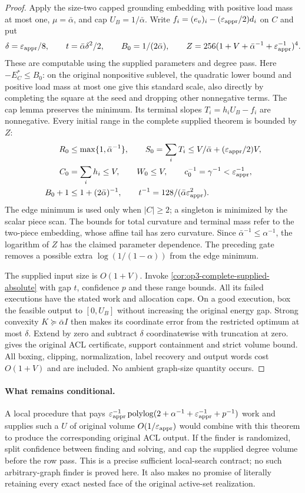 \begin{proof}
Apply the size-two capped grounding embedding with positive load mass
at most one, $\mu=\bar\alpha$, and cap $U_B=1/\bar\alpha$.
Write $f_i=(e_v)_i-(\varepsilon_{\mathrm{appr}}/2)d_i$ on $C$ and put
\[
 \delta=\varepsilon_{\mathrm{appr}}/8,\qquad t=\bar\alpha\delta^2/2,\qquad
 B_0=1/(2\bar\alpha),\qquad
 Z=256(1+V+\bar\alpha^{-1}+\varepsilon_{\mathrm{appr}}^{-1})^4.
\]
These are computable using the supplied parameters and degree pass.
Here $-E_C^*\leq B_0$: on the original nonpositive sublevel,
the quadratic lower bound and positive load mass at most one give
this standard scale, also directly by completing the square at the
seed and dropping other nonnegative terms. The cap lemma preserves
the minimum. Its terminal slopes $T_i=h_iU_B-f_i$ are nonnegative.
Every initial range in the complete supplied theorem is bounded by $Z$:
\[
 \begin{split}
 R_0&\leq\max\{1,\bar\alpha^{-1}\},\qquad
 S_0=\sum_i T_i\leq V/\bar\alpha+(\varepsilon_{\mathrm{appr}}/2)V,\\
 C_0&=\sum_i h_i\leq V,\qquad W_0\leq V,\qquad
 c_0^{-1}=\gamma^{-1}<\varepsilon_{\mathrm{appr}}^{-1},\\
 B_0+1&\leq1+(2\bar\alpha)^{-1},\qquad
 t^{-1}=128/(\bar\alpha\varepsilon_{\mathrm{appr}}^2).
 \end{split}
\]
The edge minimum is used only when $|C|\geq2$; a singleton is minimized
by the scalar piece scan. The bounds for total curvature and terminal
mass refer to the two-piece embedding, whose affine tail has zero
curvature. Since $\bar\alpha^{-1}\leq\alpha^{-1}$, the logarithm
of $Z$ has the claimed parameter dependence. The preceding gate removes
a possible extra $\log(1/(1-\alpha))$ from the edge minimum.

The supplied input size is $O(1+V)$. Invoke
\cref{cor:op3-complete-supplied-absolute} with gap $t$, confidence $p$
and these range bounds. All its failed executions have the stated
work and allocation caps. On a good execution, box the feasible
output to $[0,U_B]$ without increasing the original energy gap.
Strong convexity $K\succeq\bar\alpha I$ then makes its coordinate
error from the restricted optimum at most $\delta$.
Extend by zero and subtract $\delta$ coordinatewise with truncation
at zero.  gives the original
ACL certificate, support containment and strict volume bound.
All boxing, clipping, normalization, label recovery and output words
cost $O(1+V)$ and are included. No ambient graph-size quantity occurs.
\end{proof}

\paragraph{What remains conditional.}
A local procedure that pays
$\varepsilon_{\mathrm{appr}}^{-1}\operatorname{polylog}(2+\alpha^{-1}+\varepsilon_{\mathrm{appr}}^{-1}+p^{-1})$
work and supplies such a $U$ of original volume $O(1/\varepsilon_{\mathrm{appr}})$ would
combine with this theorem to produce the corresponding original ACL
output. If the finder is randomized, split confidence between finding
and solving, and cap the supplied degree volume before the row pass.
This is a precise sufficient local-search contract; no such arbitrary-graph
finder is proved here. It also makes no promise of literally retaining
every exact nested face of the original active-set realization.


